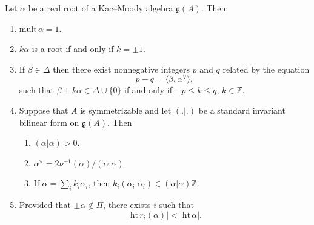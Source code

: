 \documentclass[12pt]{article}
\begin{document}
\begin{proposition}\label{prop:real-roots}
    Let $\alpha$ be a real root of a Kac--Moody algebra $\mathfrak{g}(A)$. Then:
    \begin{enumerate}[label=\alph*)]
        \item $\mathrm{mult}\,\alpha = 1$.
        \item $k\alpha$ is a root if and only if $k = \pm 1$.
        \item If $\beta \in \Delta$ then there exist nonnegative integers $p$ and $q$ related by the equation
              \[
                  p - q = \langle \beta, \alpha^\vee \rangle,
              \]
              such that $\beta + k\alpha \in \Delta \cup \{0\}$ if and only if $-p \leq k \leq q$, $k \in \mathbb{Z}$.
        \item Suppose that $A$ is symmetrizable and let $(.|.)$ be a standard invariant bilinear form on $\mathfrak{g}(A)$. Then
              \begin{enumerate}[label=(\roman*)]
                  \item $(\alpha|\alpha) > 0$.
                  \item $\alpha^\vee = 2\nu^{-1}(\alpha)/(\alpha|\alpha)$.
                  \item If $\alpha = \sum_i k_i \alpha_i$, then $k_i(\alpha_i|\alpha_i) \in (\alpha|\alpha)\mathbb{Z}$.
              \end{enumerate}
        \item Provided that $\pm \alpha \notin \Pi$, there exists $i$ such that
              \[
                  |\mathrm{ht}\, r_i(\alpha)| < |\mathrm{ht}\,\alpha|.
              \]
    \end{enumerate}
\end{proposition}
\end{document}

